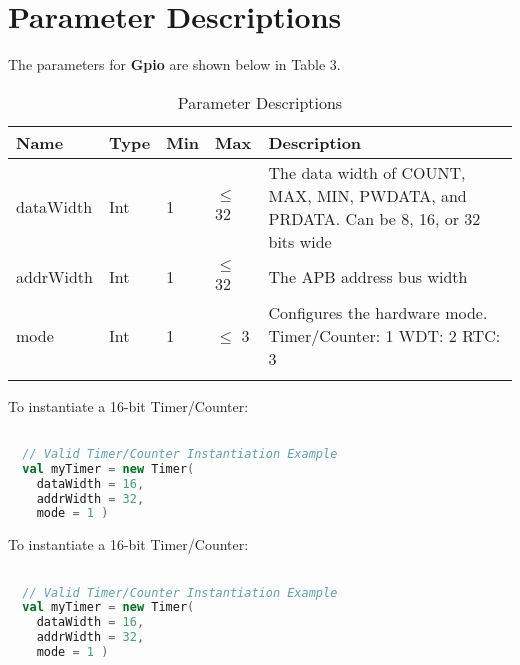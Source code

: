 
\section{Parameter Descriptions}

The parameters for \textbf{Gpio} are shown below in
Table 3.

\renewcommand*{\arraystretch}{1.4}
\begin{longtable}[H]{
    | p{}
    | p{}
    | p{}
    | p{}
    | p{} |
  }
  \hline
  \textbf{Name} &
  \textbf{Type} &
  \textbf{Min}  &
  \textbf{Max}  &
  \textbf{Description}            \\ \hline \hline

  dataWidth   &
  Int       &
  1         &
  $\leq$ 32          &
  The data width of COUNT, MAX, MIN, PWDATA, and PRDATA. Can be 8, 16, or 32 bits wide \\ \hline

  addrWidth     &
  Int           &
  1             &
  $\leq$ 32       &
  The APB address bus width  \\ \hline

  mode     &
  Int           &
  1             &
  $\leq$ 3       &
  Configures the hardware mode. \newline
  Timer/Counter: 1 \newline
  WDT: 2 \newline
  RTC: 3  \\ \hline

  \caption{Parameter Descriptions}\label{table:params}
\end{longtable}

To instantiate a 16-bit Timer/Counter:

\begin{lstlisting}[language=Scala]

  // Valid Timer/Counter Instantiation Example
  val myTimer = new Timer(
    dataWidth = 16, 
    addrWidth = 32,
    mode = 1 ) 

  \end{lstlisting}

To instantiate a 16-bit Timer/Counter:

\begin{lstlisting}[language=Scala]

  // Valid Timer/Counter Instantiation Example
  val myTimer = new Timer(
    dataWidth = 16, 
    addrWidth = 32,
    mode = 1 ) 

  \end{lstlisting}
